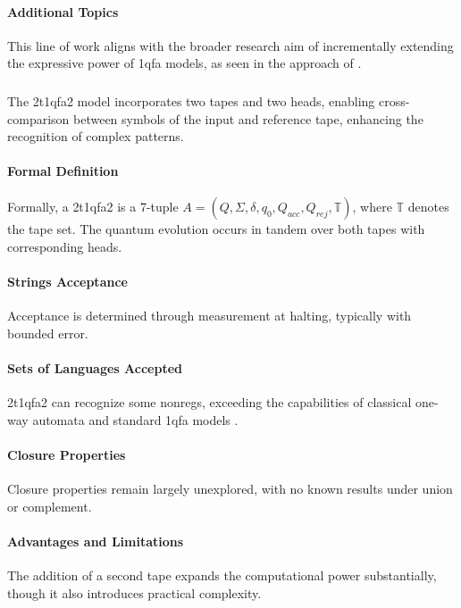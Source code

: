 \paragraph{Additional Topics}
This line of work aligns with the broader research aim of incrementally extending the expressive power of \gls{1qfa} models, as seen in the approach of \cite{ciamarra2001quantum}.

\subsubsection{}
The \gls{2t1qfa2} model incorporates two tapes and two heads, enabling cross-comparison between symbols of the input and reference tape, enhancing the recognition of complex patterns.

\paragraph{Formal Definition}
Formally, a \gls{2t1qfa2} is a 7-tuple \( A = (Q, \Sigma, \delta, q_0, Q_{acc}, Q_{rej}, \mathbb{T}) \), where \( \mathbb{T} \) denotes the tape set. The quantum evolution occurs in tandem over both tapes with corresponding heads.

\paragraph{Strings Acceptance}
Acceptance is determined through measurement at halting, typically with bounded error.

\paragraph{Sets of Languages Accepted}
\gls{2t1qfa2} can recognize some non\glspl{reg}, exceeding the capabilities of classical one-way automata and standard \gls{1qfa} models \cite{ganguly20162}.

\paragraph{Closure Properties}
Closure properties remain largely unexplored, with no known results under union or complement.

\paragraph{Advantages and Limitations}
The addition of a second tape expands the computational power substantially, though it also introduces practical complexity.

